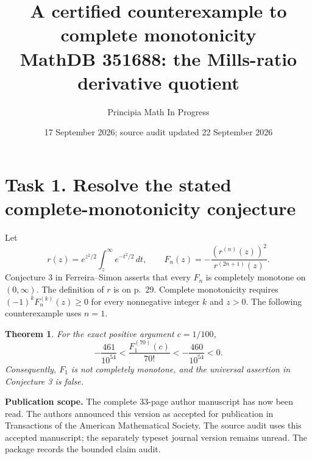 \documentclass[11pt]{article}
\title{A certified counterexample to complete monotonicity\\
\large MathDB 351688: the Mills-ratio derivative quotient}
\author{Principia Math In Progress}
\date{17 September 2026; source audit updated 22 September 2026}
\newtheorem{theorem}{Theorem}
\begin{document}
\maketitle

\section*{Task 1. Resolve the stated complete-monotonicity conjecture}
Let
\[
 r(z)=e^{z^2/2}\int_z^\infty e^{-t^2/2}\,dt,
 \qquad F_n(z)=-\frac{(r^{(n)}(z))^2}{r^{(2n+1)}(z)}.
\]
Conjecture 3 in Ferreira--Simon \cite[p.~31]{FS} asserts that every
\(F_n\) is completely monotone on \((0,\infty)\). The definition of
\(r\) is on p.~29. Complete monotonicity requires
\((-1)^kF_n^{(k)}(z)\geq0\) for every nonnegative integer \(k\) and
\(z>0\). The following counterexample uses \(n=1\).

\begin{theorem}
For the exact positive argument \(c=1/100\),
\begin{equation}\label{negative}
 -\frac{461}{10^{54}}
 < \frac{F_1^{(70)}(c)}{70!}
 < -\frac{460}{10^{54}}<0.
\end{equation}
Consequently, \(F_1\) is not completely monotone, and the universal
assertion in Conjecture 3 is false.
\end{theorem}

\noindent\textbf{Publication scope.}
The complete 33-page author manuscript \cite{FS} has now been read.
The authors announced this version as accepted for publication in
Transactions of the American Mathematical Society. The source audit
uses this accepted manuscript; the separately typeset journal version
remains unread. The package records the bounded claim audit.
\end{document}
